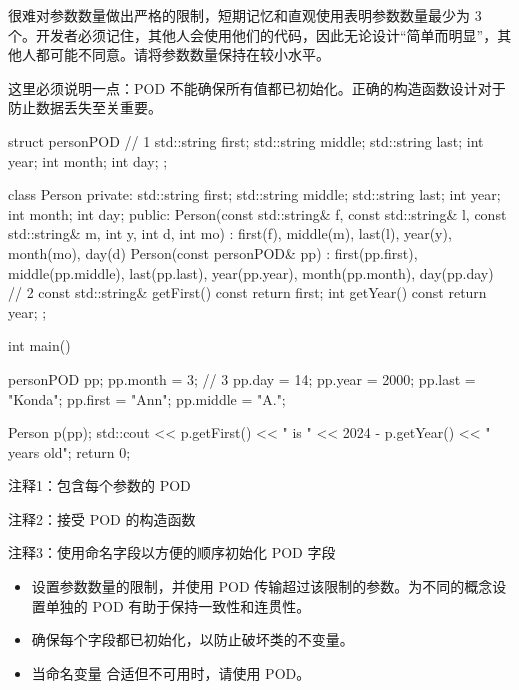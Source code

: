 很难对参数数量做出严格的限制，短期记忆和直观使用表明参数数量最少为 3 个。开发者必须记住，其他人会使用他们的代码，因此无论设计“简单而明显”，其他人都可能不同意。请将参数数量保持在较小水平。

这里必须说明一点：POD 不能确保所有值都已初始化。正确的构造函数设计对于防止数据丢失至关重要。


\begin{cpp}
struct personPOD { // 1
  std::string first;
  std::string middle;
  std::string last;
  int year;
  int month;
  int day;
};

class Person {
private:
  std::string first;
  std::string middle;
  std::string last;
  int year;
  int month;
  int day;
public:
  Person(const std::string& f, const std::string& l, const std::string& m,
      int y, int d, int mo) :
    first(f), middle(m), last(l), year(y), month(mo), day(d) {}
  Person(const personPOD& pp) : first(pp.first), middle(pp.middle),
    last(pp.last), year(pp.year), month(pp.month),
    day(pp.day) {} // 2
  const std::string& getFirst() const { return first; }
  int getYear() const { return year; }
};

int main() {
  personPOD pp;
  pp.month = 3; // 3
  pp.day = 14;
  pp.year = 2000;
  pp.last = "Konda";
  pp.first = "Ann";
  pp.middle = "A.";

  Person p(pp);
  std::cout << p.getFirst() << " is " << 2024 - p.getYear() << " years old\n";
  return 0;
}
\end{cpp}

{\footnotesize
注释1：包含每个参数的 POD

注释2：接受 POD 的构造函数

注释3：使用命名字段以方便的顺序初始化 POD 字段
}


\begin{itemize}
\item
设置参数数量的限制，并使用 POD 传输超过该限制的参数。为不同的概念设置单独的 POD 有助于保持一致性和连贯性。

\item
确保每个字段都已初始化，以防止破坏类的不变量。

\item
当命名变量 合适但不可用时，请使用 POD。
\end{itemize}
















